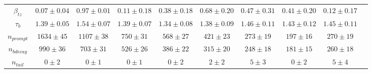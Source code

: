 \begin{sidewaystable}[h]
\begin{center}
{\begin{tabular}{c|ccccccccc}
$\beta_{tz}$  & $0.07\pm0.04$ & $0.97\pm0.01$ & $0.11\pm0.18$ & $0.38\pm0.18$ & $0.68\pm0.20$ & $0.47\pm0.31$ & $0.41\pm0.20$ & $0.12\pm0.17$\\
$\tau_{b}$  & $1.39\pm0.05$ & $1.54\pm0.07$ & $1.39\pm0.07$ & $1.34\pm0.08$ & $1.38\pm0.09$ & $1.46\pm0.11$ & $1.43\pm0.12$ & $1.45\pm0.11$\\
$n_{prompt}$  & $1634\pm45$ & $1107\pm38$ & $750\pm31$ & $568\pm27$ & $421\pm23$ & $273\pm19$ & $197\pm16$ & $270\pm19$\\
$n_{bdecay}$  & $990\pm36$ & $703\pm31$ & $526\pm26$ & $386\pm22$ & $315\pm20$ & $248\pm18$ & $181\pm15$ & $260\pm18$\\
$n_{tail}$  & $0\pm2$ & $0\pm1$ & $0\pm1$ & $0\pm2$ & $2\pm2$ & $5\pm3$ & $0\pm2$ & $5\pm4$\\
\hline
\end{tabular}
}
\end{center} 
\end{sidewaystable}  




